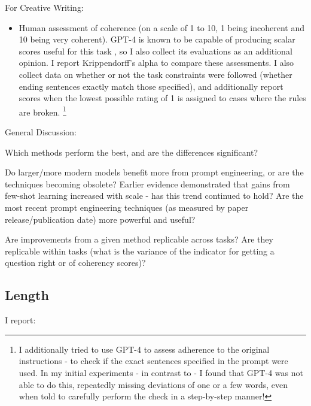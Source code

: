 \documentclass[11pt]{article}
\begin{document}
For Creative Writing:
\begin{itemize}
  \item Human assessment of coherence (on a scale of 1 to 10, 1 being incoherent and 10 being very coherent). GPT-4 is known to be capable of producing scalar scores useful for this task \cite{yao_tree_2023}, so I also collect its evaluations as an additional opinion. I report Krippendorff's alpha to compare these assessments. I also collect data on whether or not the task constraints were followed (whether ending sentences exactly match those specified), and additionally report scores when the lowest possible rating of 1 is assigned to cases where the rules are broken. \footnote{I additionally tried to use GPT-4 to assess adherence to the original instructions - to check if the exact sentences specified in the prompt were used. In my initial experiments - in contrast to \citealp{yao_tree_2023} - I found that GPT-4 was not able to do this, repeatedly missing deviations of one or a few words, even when told to carefully perform the check in a step-by-step manner!}
\end{itemize}

General Discussion:

Which methods perform the best, and are the differences significant?

Do larger/more modern models benefit more from prompt engineering, or are the techniques becoming obsolete? Earlier evidence demonstrated that gains from few-shot learning increased with scale - has this trend continued to hold? \cite{brown_language_2020} Are the most recent prompt engineering techniques (as measured by paper release/publication date) more powerful and useful?

Are improvements from a given method replicable across tasks? Are they replicable within tasks (what is the variance of the indicator for getting a question right or of coherency scores)?

\subsection*{Length}

I report:
\end{document}
